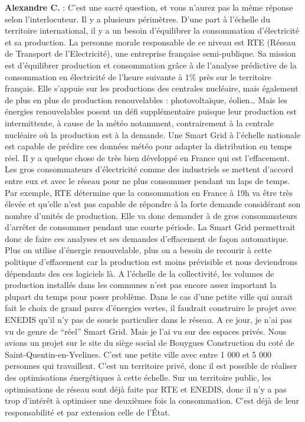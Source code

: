 \textbf{Alexandre C.} :
C’est une sacré question, et vous n’aurez pas la même réponse selon l’interlocuteur.
Il y a plusieurs périmètres.
D’une part à l’échelle du territoire international, il y a un besoin d’équilibrer la consommation d’électricité et sa production.
La personne morale responsable de ce niveau est RTE (Réseau de Transport de l’Electricité), une entreprise française semi-publique.
Sa mission est d’équilibrer production et consommation grâce à de l’analyse prédictive de la consommation en électricité
de l’heure suivante à 1\% près sur le territoire français.
Elle s’appuie sur les productions des centrales nucléaire, mais également de plus en plus de production renouvelables : photovoltaïque, éolien\dots
Mais les énergies renouvelables posent un défi supplémentaire puisque leur production est intermittente,
à cause de la météo notamment, contrairement à la centrale nucléaire où la production est à la demande.
Une Smart Grid à l’échelle nationale est capable de prédire ces données météo pour adapter la distribution en temps réel.
Il y a quelque chose de très bien développé en France qui est l’effacement.
Les gros consommateurs d'électricité comme des industriels se mettent d’accord entre eux et avec le réseau
pour ne plus consommer pendant un laps de temps.
Par exemple, RTE détermine que la consommation en France à 19h va être très élevée
et qu’elle n’est pas capable de répondre à la forte demande considérant son nombre d’unités de production.
Elle va donc demander à de gros consommateurs d’arrêter de consommer pendant une courte période.
La Smart Grid permettrait donc de faire ces analyses et ses demandes d’effacement de façon automatique.
Plus on utilise d’énergie renouvelable, plus on a besoin de recourir à cette politique d’effacement
car la production est moins prévisible et nous deviendrons dépendants des ces logiciels là.
A l'échelle de la collectivité, les volumes de production installés dans les communes
n’est pas encore assez important la plupart du temps pour poser problème.
Dans le cas d’une petite ville qui aurait fait le choix de grand parcs d’énergies vertes,
il faudrait construire le projet avec ENEDIS qu’il n’y pas de soucis particulier dans le réseau.
A ce jour, je n’ai pas vu de genre de “réel” Smart Grid.
Mais je l’ai vu sur des espaces privés.
Nous avions un projet sur le site du siège social de Bouygues Construction du coté de Saint-Quentin-en-Yvelines.
C’est une petite ville avec entre 1 000 et 5 000 personnes qui travaillent.
C’est un territoire privé, donc il est possible de réaliser des optimisations énergétiques à cette échelle.
Sur un territoire public, les optimisations de réseau sont déjà faite par RTE et ENEDIS,
donc il n’y a pas trop d'intérêt à optimiser une deuxièmes fois la consommation.
C’est déjà de leur responsabilité et par extension celle de l’État.

